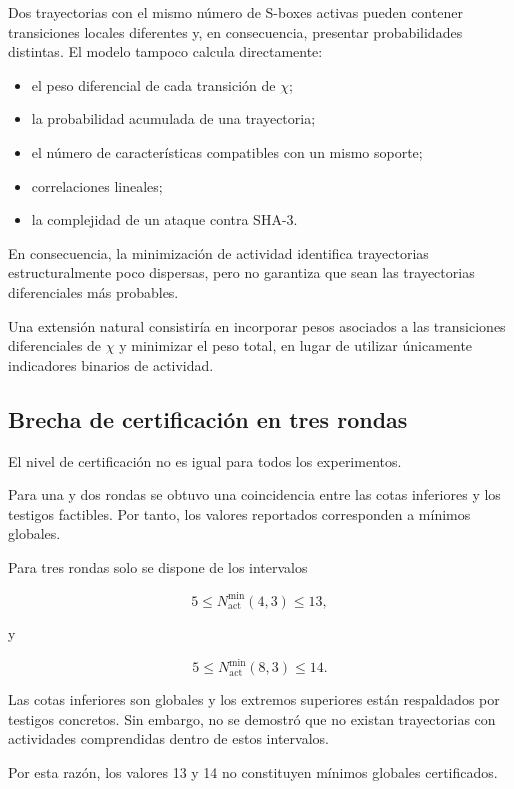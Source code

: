 Dos trayectorias con el mismo número de S-boxes activas pueden contener
transiciones locales diferentes y, en consecuencia, presentar
probabilidades distintas. El modelo tampoco calcula directamente:

\begin{itemize}
    \item el peso diferencial de cada transición de $\chi$;
    \item la probabilidad acumulada de una trayectoria;
    \item el número de características compatibles con un mismo soporte;
    \item correlaciones lineales;
    \item la complejidad de un ataque contra SHA-3.
\end{itemize}

En consecuencia, la minimización de actividad identifica trayectorias
estructuralmente poco dispersas, pero no garantiza que sean las
trayectorias diferenciales más probables.

Una extensión natural consistiría en incorporar pesos asociados a las
transiciones diferenciales de $\chi$ y minimizar el peso total, en lugar
de utilizar únicamente indicadores binarios de actividad.


\subsection{Brecha de certificación en tres rondas}
\label{subsec:limitacion_tres_rondas}

El nivel de certificación no es igual para todos los experimentos.

Para una y dos rondas se obtuvo una coincidencia entre las cotas inferiores
y los testigos factibles. Por tanto, los valores reportados corresponden a
mínimos globales.

Para tres rondas solo se dispone de los intervalos

\[
5
\leq
N_{\mathrm{act}}^{\min}(4,3)
\leq
13,
\]

y

\[
5
\leq
N_{\mathrm{act}}^{\min}(8,3)
\leq
14.
\]

Las cotas inferiores son globales y los extremos superiores están
respaldados por testigos concretos. Sin embargo, no se demostró que no
existan trayectorias con actividades comprendidas dentro de estos
intervalos.

Por esta razón, los valores 13 y 14 no constituyen mínimos globales
certificados.


